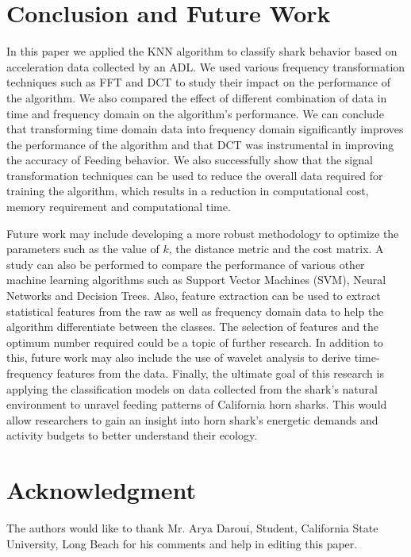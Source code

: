 \documentclass[conference]{IEEEtran}
\begin{document}
\section{Conclusion and Future Work}
In this paper we applied the KNN algorithm to classify shark behavior based on acceleration data collected by an ADL. We used various frequency transformation techniques such as FFT and DCT to study their impact on the performance of the algorithm. We also compared the effect of different combination of data in time and frequency domain on the algorithm’s performance. We can conclude that transforming time domain data into frequency domain significantly improves the performance of the algorithm and that DCT was instrumental in improving the accuracy of Feeding behavior.  We also successfully show that the signal transformation techniques can be used to reduce the overall data required for training the algorithm, which results in a reduction in computational cost, memory requirement and computational time.

Future work may include developing a more robust methodology to optimize the parameters such as the value of $k$, the distance metric and the cost matrix. A study can also be performed to  compare the performance of various other machine learning algorithms such as Support Vector Machines (SVM), Neural Networks and Decision Trees. Also, feature extraction can be used to extract statistical features from the raw as well as frequency domain data to help the algorithm differentiate between the classes. The selection of features and the optimum number required could be a topic of further research. In addition to this, future work may also include the use of wavelet analysis to derive time-frequency features from the data.  Finally, the ultimate goal of this research is applying the classification models on data collected from the shark’s natural environment to unravel feeding patterns of California horn sharks. This would allow researchers to gain an insight into horn shark’s energetic demands and activity budgets to better understand their ecology.

\section{Acknowledgment}

The authors would like to thank Mr. Arya Daroui, Student, California State University, Long Beach for his comments and help in editing this paper.



\end{document}
